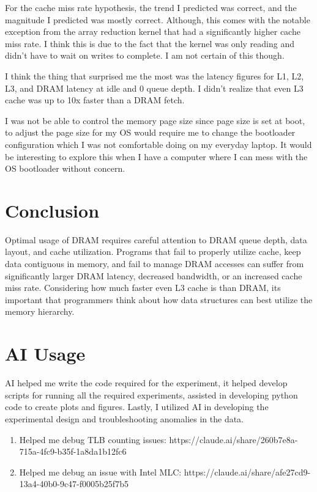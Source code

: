 \documentclass[11pt]{article}
\begin{document}
For the cache miss rate hypothesis, the trend I predicted was correct, and the magnitude I predicted was mostly
correct. Although, this comes with the notable exception from the array reduction kernel that had a significantly
higher cache miss rate. I think this is due to the fact that the kernel was only reading and didn't have to wait on
writes to complete. I am not certain of this though.

I think the thing that surprised me the most was the latency figures for L1, L2, L3, and DRAM latency at idle and 0
queue depth. I didn't realize that even L3 cache was up to 10x faster than a DRAM fetch.

I was not be able to control the memory page size since page size is set at boot, to adjust the page size for my OS
would require me to change the bootloader configuration which I was not comfortable doing on my everyday laptop. It
would be interesting to explore this when I have a computer where I can mess with the OS bootloader without concern.

\section{Conclusion}

Optimal usage of DRAM requires careful attention to DRAM queue depth, data layout, and cache utilization. Programs that
fail to properly utilize cache, keep data contiguous in memory, and fail to manage DRAM accesses can suffer from
significantly larger DRAM latency, decreased bandwidth, or an increased cache miss rate. Considering how much faster
even L3 cache is than DRAM, its important that programmers think about how data structures can best utilize the memory
hierarchy.

\appendix

\section{AI Usage}

AI helped me write the code required for the experiment, it helped develop scripts for running all the required
experiments, assisted in developing python code to create plots and figures. Lastly, I utilized AI in developing the
experimental design and troubleshooting anomalies in the data.

\begin{enumerate}
	\item Helped me debug TLB counting issues: https://claude.ai/share/260b7e8a-715a-4fc9-b35f-1a8da1b12fc6
	\item Helped me debug an issue with Intel MLC: https://claude.ai/share/afe27cd9-13a4-40b0-9c47-f0005b25f7b5
\end{enumerate}
\end{document}
